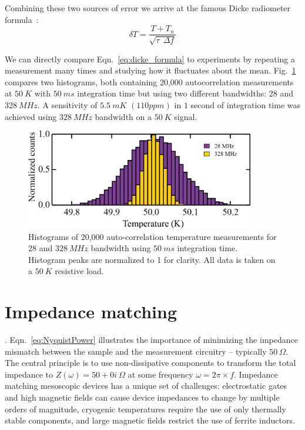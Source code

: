 Combining these two sources of error we arrive at the famous Dicke radiometer formula~\cite{dicke_measurement_1946}:
\begin{equation}\label{eq:dicke_formula}
\delta T = \frac{T+T_n}{\sqrt{\tau~~\Delta f}}
\end{equation}

We can directly compare Eqn.~\ref{eq:dicke_formula} to experiments by repeating a measurement many times and studying how it fluctuates about the mean. Fig.~\ref{fig:JNT_histograms} compares two histograms, both containing 20,000 autocorrelation measurements at $50~K$ with $50~ms$ integration time but using two different bandwidths: $28$ and $328~MHz$. A sensitivity of $5.5~mK$ $(110 ppm)$ in $1$ second of integration time was achieved using $328~MHz$ bandwidth on a $50~K$ signal.
\begin{figure}
\centering
\includegraphics[width = 100mm]{figures/Johnson_noise_thermometry/histograms.png}
\caption{Histograms of 20,000 auto-correlation temperature measurements for $28$ and $328~MHz$ bandwidth using $50~ms$ integration time. Histogram peaks are normalized to 1 for clarity. All data is taken on a $50~K$ resistive load.}
\label{fig:JNT_histograms}
\end{figure}

\section{Impedance matching}\label{section:matching}
. Eqn.~\ref{eq:NyquistPower} illustrates the importance of minimizing the impedance mismatch between the sample and the measurement circuitry -- typically $50~\Omega$. The central principle is to use non-dissipative components to transform the total impedance to $Z(\omega) = 50+0i~\Omega$ at some frequency $\omega = 2\pi\times f$. Impedance matching mesoscopic devices has a unique set of challenges: electrostatic gates and high magnetic fields can cause device impedances to change by multiple orders of magnitude, cryogenic temperatures require the use of only thermally stable components, and large magnetic fields restrict the use of ferrite inductors.

